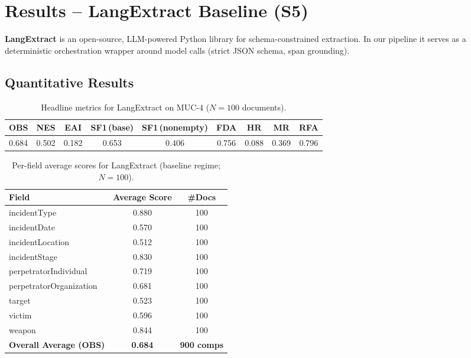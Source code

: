 \section{Results – LangExtract Baseline (S5)}
\label{sec:eval-langextract}

\textbf{LangExtract} is an open-source, LLM-powered Python library for schema-constrained extraction. 
In our pipeline it serves as a deterministic orchestration wrapper around model calls (strict JSON schema, span grounding).

\subsection*{Quantitative Results}

\begin{table}[H]
    \centering
    \caption{Headline metrics for LangExtract on MUC-4 ($N{=}100$ documents).}
    \label{tab:langextract-headline}
    \begin{tabular}{lcccccccc}
        \toprule
        OBS & NES & EAI & SF1\,(base) & SF1\,(nonempty) & FDA & HR & MR & RFA \\
        \midrule
        0.684 & 0.502 & 0.182 & 0.653 & 0.406 & 0.756 & 0.088 & 0.369 & 0.796 \\
        \bottomrule
    \end{tabular}
\end{table}

\begin{table}[H]
    \centering
    \caption{Per-field average scores for LangExtract (baseline regime; $N{=}100$).}
    \label{tab:langextract-perfield}
    \begin{tabular}{lcc}
        \toprule
        Field & Average Score & \#Docs \\
        \midrule
        incidentType & 0.880 & 100 \\
        incidentDate & 0.570 & 100 \\
        incidentLocation & 0.512 & 100 \\
        incidentStage & 0.830 & 100 \\
        perpetratorIndividual & 0.719 & 100 \\
        perpetratorOrganization & 0.681 & 100 \\
        target & 0.523 & 100 \\
        victim & 0.596 & 100 \\
        weapon & 0.844 & 100 \\
        \midrule
        \textbf{Overall Average (OBS)} & \textbf{0.684} & \textbf{900 comps} \\
        \bottomrule
    \end{tabular}
\end{table}

